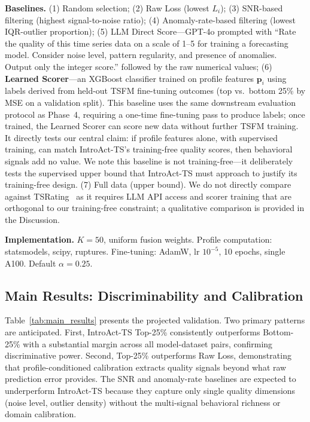 \documentclass{article}
\begin{document}
\textbf{Baselines.} (1) Random selection; (2) Raw Loss (lowest $L_i$); (3) SNR-based filtering (highest signal-to-noise ratio); (4) Anomaly-rate-based filtering (lowest IQR-outlier proportion); (5) LLM Direct Score---GPT-4o prompted with ``Rate the quality of this time series data on a scale of 1--5 for training a forecasting model. Consider noise level, pattern regularity, and presence of anomalies. Output only the integer score.'' followed by the raw numerical values; (6) \textbf{Learned Scorer}---an XGBoost classifier trained on profile features $\mathbf{p}_i$ using labels derived from held-out TSFM fine-tuning outcomes (top vs.\ bottom 25\% by MSE on a validation split). This baseline uses the same downstream evaluation protocol as Phase~4, requiring a one-time fine-tuning pass to produce labels; once trained, the Learned Scorer can score new data without further TSFM training. It directly tests our central claim: if profile features alone, with supervised training, can match IntroAct-TS's training-free quality scores, then behavioral signals add no value. We note this baseline is not training-free---it deliberately tests the supervised upper bound that IntroAct-TS must approach to justify its training-free design. (7) Full data (upper bound). We do not directly compare against TSRating~\citep{chen2026tsrating} as it requires LLM API access and scorer training that are orthogonal to our training-free constraint; a qualitative comparison is provided in the Discussion.

\textbf{Implementation.} $K = 50$, uniform fusion weights. Profile computation: statsmodels, scipy, ruptures. Fine-tuning: AdamW, lr $10^{-5}$, 10 epochs, single A100. Default $\alpha = 0.25$.

\subsection{Main Results: Discriminability and Calibration}

\label{sec:main_results}

Table~\ref{tab:main_results} presents the projected validation. Two primary patterns are anticipated. First, IntroAct-TS Top-25\% consistently outperforms Bottom-25\% with a substantial margin across all model-dataset pairs, confirming discriminative power. Second, Top-25\% outperforms Raw Loss, demonstrating that profile-conditioned calibration extracts quality signals beyond what raw prediction error provides. The SNR and anomaly-rate baselines are expected to underperform IntroAct-TS because they capture only single quality dimensions (noise level, outlier density) without the multi-signal behavioral richness or domain calibration.
\end{document}
